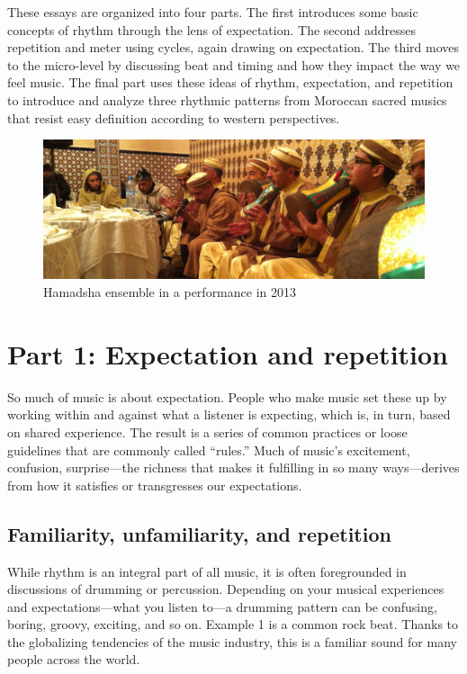 \documentclass[twoside]{article}
\begin{document}
These essays are organized into four parts. The first introduces some
basic concepts of rhythm through the lens of expectation. The second
addresses repetition and meter using cycles, again drawing on
expectation. The third moves to the micro-level by discussing beat and
timing and how they impact the way we feel music. The final part uses
these ideas of rhythm, expectation, and repetition to introduce and
analyze three rhythmic patterns from Moroccan sacred musics that resist
easy definition according to western perspectives.

\begin{figure}
  \centering
  \includegraphics[width=\textwidth]{../../chapters/witulski-rhythm/images/Hamadsha2013.jpg}
  \caption*{Hamadsha ensemble in a performance in 2013}
\end{figure}  

\hypertarget{part-1-expectation-and-repetition}{%
\section*{Part 1: Expectation and
repetition}\label{part-1-expectation-and-repetition}}

So much of music is about expectation. People who make music set these
up by working within and against what a listener is expecting, which is,
in turn, based on shared experience. The result is a series of common
practices or loose guidelines that are commonly called ``rules.'' Much
of music's excitement, confusion, surprise---the richness that makes it
fulfilling in so many ways---derives from how it satisfies or
transgresses our expectations.

\hypertarget{familiarity-unfamiliarity-and-repetition}{%
\subsection*{Familiarity, unfamiliarity, and
repetition}\label{familiarity-unfamiliarity-and-repetition}}

While rhythm is an integral part of all music, it is often foregrounded
in discussions of drumming or percussion. Depending on your musical
experiences and expectations---what you listen to---a drumming pattern
can be confusing, boring, groovy, exciting, and so on. Example 1 is a common
rock beat. Thanks to the globalizing tendencies of the music industry,
this is a familiar sound for many people across the world.
\end{document}
